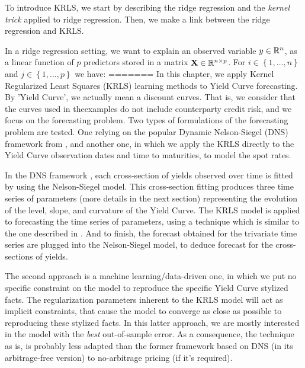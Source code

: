 To introduce KRLS, we start by describing the ridge regression \cite{hoerl1970ridge} and the {\it kernel trick} applied to ridge regression. Then, we make a link between the ridge regression and KRLS. 

In a ridge regression setting, we want to explain an observed variable $y \in \mathbb{R}^n$, as a linear function of $p$ predictors stored in a matrix ${\bf X} \in \mathbb{R}^{n \times p}$. For $i \in \left \lbrace 1, \ldots, n \right \rbrace $ and $j \in \left \lbrace1, \ldots, p \right \rbrace$ we have:
=======
In this chapter, we apply Kernel Regularized Least Squares (KRLS) learning methods to Yield Curve forecasting. By 'Yield Curve', we actually mean a discount curves. That is, we consider that the curves used in theexamples do not include counterparty credit risk, and we focus on the forecasting problem. Two types of formulations of the forecasting problem are tested. One relying on the popular Dynamic Nelson-Siegel (DNS) framework from \cite{diebold2006forecasting}, and another one, in which we apply the KRLS directly to the Yield Curve observation dates and time to maturities, to model the spot rates.

\medskip

In the DNS framework \cite{diebold2006forecasting}, each cross-section of yields observed over time is fitted by using the Nelson-Siegel \cite{nelson1987parsimonious} model. This cross-section fitting produces three time series of parameters (more details in the next section) representing the evolution of the level, slope, and curvature of the Yield Curve. The KRLS model  is applied to forecasting  the time series of parameters, using a technique which is similar to the one described in \cite{exterkate2016nonlinear}. And to finish, the forecast obtained for the trivariate time series are plugged into the Nelson-Siegel model, to deduce forecast for the cross-sections of yields.

\medskip

The second approach is a machine learning/data-driven one, in which we put no  specific constraint on the model to reproduce the specific Yield Curve stylized facts. The regularization parameters inherent to the KRLS model will act as implicit constraints, that cause the model to converge as close as possible to reproducing these stylized facts. In this latter approach, we are mostly interested in the model with the {\it best} out-of-sample error. As a consequence, the technique as is, is probably less adapted than the former framework based on DNS (in its arbitrage-free version) to no-arbitrage pricing (if it's required).

